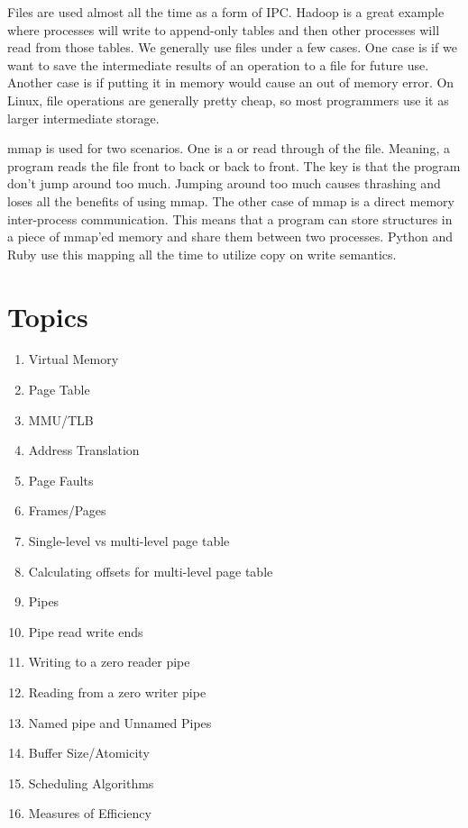 Files are used almost all the time as a form of IPC.
Hadoop is a great example where processes will write to append-only tables and then other processes will read from those tables.
We generally use files under a few cases.
One case is if we want to save the intermediate results of an operation to a file for future use.
Another case is if putting it in memory would cause an out of memory error.
On Linux, file operations are generally pretty cheap, so most programmers use it as larger intermediate storage.

mmap is used for two scenarios.
One is a  or  read through of the file.
Meaning, a program reads the file front to back or back to front.
The key is that the program don't jump around too much.
Jumping around too much causes thrashing and loses all the benefits of using mmap.
The other case of mmap is a direct memory inter-process communication.
This means that a program can store structures in a piece of mmap'ed memory and share them between two processes.
Python and Ruby use this mapping all the time to utilize copy on write semantics.

\section{Topics}

\begin{enumerate}
  \item Virtual Memory
  \item Page Table
  \item MMU/TLB
  \item Address Translation
  \item Page Faults
  \item Frames/Pages
  \item Single-level vs multi-level page table
  \item Calculating offsets for multi-level page table
  \item Pipes
  \item Pipe read write ends
  \item Writing to a zero reader pipe
  \item Reading from a zero writer pipe
  \item Named pipe and Unnamed Pipes
  \item Buffer Size/Atomicity
  \item Scheduling Algorithms
  \item Measures of Efficiency
\end{enumerate}

